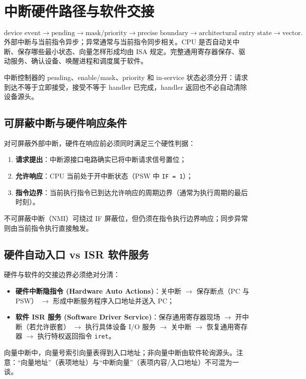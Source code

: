 \documentclass[UTF8,fontset=fandol,11pt,a4paper]{ctexart}
\newcommand{\kw}[1]{\textbf{\color{deep}#1}}
\newcommand{\code}[1]{\texttt{#1}}
\begin{document}
\section{中断硬件路径与软件交接}
\[
\text{device event}\to\text{pending}\to\text{mask/priority}\to\text{precise boundary}\to\text{architectural entry state}\to\text{vector}.
\]
外部中断与当前指令异步；异常通常与当前指令同步相关。CPU 是否自动关中断、保存哪些最小状态、向量怎样形成均由 ISA 规定。完整通用寄存器保存、驱动服务、确认设备、唤醒进程和调度属于软件。

中断控制器的 pending、enable/mask、priority 和 in-service 状态必须分开：请求到达不等于立即接受，接受不等于 handler 已完成，handler 返回也不必自动清除设备源头。

\subsection{可屏蔽中断与硬件响应条件}
对可屏蔽外部中断，硬件在响应前必须同时满足三个硬性判据：
\begin{enumerate}
  \item \kw{请求提出}：中断源接口电路确实已将中断请求信号置位；
  \item \kw{允许响应}：CPU 当前处于开中断状态（PSW 中 \code{IF = 1}）；
  \item \kw{指令边界}：当前执行指令已到达允许响应的周期边界（通常为执行周期的最后时刻）。
\end{enumerate}
不可屏蔽中断（NMI）可绕过 IF 屏蔽位，但仍须在指令执行边界响应；同步异常则由当前指令执行直接触发。

\subsection{硬件自动入口 vs ISR 软件服务}
硬件与软件的交接边界必须绝对分清：
\begin{itemize}
  \item \kw{硬件中断隐指令 (Hardware Auto Actions)}：关中断 $\to$ 保存断点（PC 与 PSW） $\to$ 形成中断服务程序入口地址并送入 PC；
  \item \kw{软件 ISR 服务 (Software Driver Service)}：保存通用寄存器现场 $\to$ 开中断（若允许嵌套） $\to$ 执行具体设备 I/O 服务 $\to$ 关中断 $\to$ 恢复通用寄存器 $\to$ 执行特权返回指令 \code{iret}。
\end{itemize}
向量中断中，向量号索引向量表得到入口地址；非向量中断由软件轮询源头。注意：“向量地址”（表项地址）与“中断向量”（表项内容/入口地址）不可混为一谈。

\begin{center}

\end{center}
\end{document}
